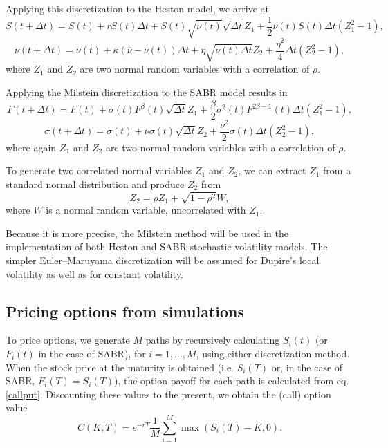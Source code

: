 Applying this discretization to the Heston model, we arrive at
\begin{equation}
S(t+\Delta t)=S(t)+rS(t)\Delta t+S(t)\sqrt{\nu(t)}\sqrt{\Delta t}Z_1+\frac{1}{2}\nu(t)S(t)\Delta t(Z_1^2-1),
\end{equation}
\begin{equation}
\nu(t+\Delta t)=\nu(t)+\kappa(\overline{\nu}-\nu(t))\Delta t+\eta\sqrt{\nu(t)\Delta t}Z_2+\frac{\eta^2}{4}\Delta t(Z_2^2-1),
\end{equation}
\noindent where $Z_1$ and $Z_2$ are two normal random variables with a correlation of $\rho$.


Applying the Milstein discretization to the SABR model results in
\begin{equation}
F(t+\Delta t)=F(t)+\sigma(t)F^\beta(t)\sqrt{\Delta t}Z_1+\frac{\beta}{2}\sigma^2(t)F^{2\beta-1}(t)\Delta t(Z_1^2-1),
\end{equation}
\begin{equation}
\sigma(t+\Delta t)=\sigma(t)+\nu\sigma(t)\sqrt{\Delta t}Z_2+\frac{\nu^2}{2}\sigma(t)\Delta t(Z_2^2-1),
\end{equation}
\noindent where again $Z_1$ and $Z_2$ are two normal random variables with a correlation of $\rho$.

To generate two correlated normal variables $Z_1$ and $Z_2$, we can extract $Z_1$ from a standard normal distribution and produce $Z_2$ from
\begin{equation}\label{normcorr}
Z_2=\rho Z_1+\sqrt{1-\rho^2}W,
\end{equation}
\noindent where $W$ is a normal random variable, uncorrelated with $Z_1$.

Because it is more precise, the Milstein method will be used in the implementation of both Heston and SABR stochastic volatility models. The simpler Euler–Maruyama discretization will be assumed for Dupire's local volatility as well as for constant volatility.


\subsection{Pricing options from simulations}
To price options, we generate $M$ paths by recursively calculating $S_i(t)$ (or $F_i(t)$ in the case of SABR), for $i=1,\ldots,M$, using either discretization method. When the stock price at the maturity is obtained (i.e. $S_i(T)$ or, in the case of SABR, $F_i(T)=S_i(T)$), the option payoff for each path is calculated from eq.\eqref{callput}. Discounting these values to the present, we obtain the (call) option value
\begin{equation}
C(K,T)=e^{-rT}\frac{1}{M}\sum_{i=1}^M\max\left(S_i(T)-K,0\right).
\end{equation}

